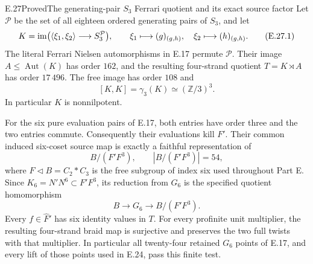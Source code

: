 \begin{statement}{E.27}{Proved}{The generating-pair \texorpdfstring{$S_3$}{S3} Ferrari quotient and its exact source factor}
Let $\mathcal P$ be the set of all eighteen ordered generating pairs of
$S_3$, and let
\[
 K=\operatorname{im}\bigl(\langle\xi_1,\xi_2\rangle\longrightarrow S_3^{\mathcal P}\bigr),
 \qquad \xi_1\longmapsto(g)_{(g,h)},\quad
 \xi_2\longmapsto(h)_{(g,h)}.
 \tag{E.27.1}
\]
The literal Ferrari Nielsen automorphisms in E.17 permute $\mathcal P$.
Their image $A\leq\operatorname{Aut}(K)$ has order $162$, and the resulting
four-strand quotient $T=K\rtimes A$ has order $17\,496$.
The free image has order $108$ and
\[
 [K,K]=\gamma_3(K)\simeq(\mathbb Z/3)^3.
 \tag{E.27.2}
\]
In particular $K$ is nonnilpotent.

For the six pure evaluation pairs of E.17, both entries have order
three and the two entries commute. Consequently their evaluations
kill $F'$. Their common induced six-coset source map is exactly a
faithful representation of
\[
 B/(F'F^3),\qquad |B/(F'F^3)|=54,
 \tag{E.27.3}
\]
where $F\triangleleft B=C_2*C_3$ is the free subgroup of index six
used throughout Part E. Since $K_6=N'N^6\subset F'F^3$, its reduction
from $G_6$ is the specified quotient homomorphism
\[
 B\longrightarrow G_6\longrightarrow B/(F'F^3).
 \tag{E.27.4}
\]
Every $f\in\widehat F'$ has six identity values in $T$. For every
profinite unit multiplier, the resulting four-strand braid map is
surjective and preserves the two full twists with that multiplier.
In particular all twenty-four retained $G_6$ points of E.17, and
every lift of those points used in E.24, pass this finite test.
\end{statement}

